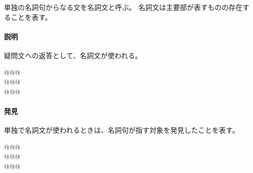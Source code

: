 単独の名詞句からなる文を名詞文と呼ぶ。
名詞文は主要部が表すものの存在することを表す。

\paragraph{説明}
疑問文への返答として、名詞文が使われる。

\begin{exe}
    \ex \gll @@@\\
    @@@ \\
    \glt @@@
\end{exe}

\paragraph{発見}
単独で名詞文が使われるときは、名詞句が指す対象を発見したことを表す。

\begin{exe}
    \ex \gll @@@\\
    @@@ \\
    \glt @@@
\end{exe}